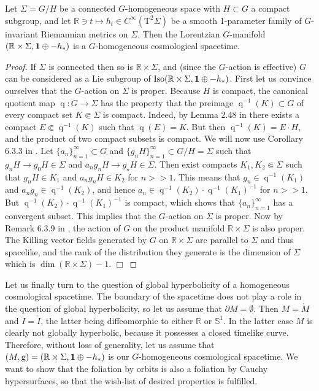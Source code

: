 \documentclass{article}
\begin{document}
\begin{proposition} Let $\Sigma=G/H$ be a connected $G$-homogeneous space with $H\subset G$ a compact subgroup, and let $\mathbb{R}\ni t\mapsto h_t\in C^\infty(\mathrm{T}^2\Sigma)$ be a smooth 1-parameter family of $G$-invariant Riemannian metrics on $\Sigma$. Then the Lorentzian $G$-manifold $(\mathbb{R}\times\Sigma,{\mathbf 1}\oplus-h_*)$ is a $G$-homogeneous cosmological spacetime.
\end{proposition}
\begin{proof}If $\Sigma$ is connected then so is $\mathbb{R}\times\Sigma$, and (since the $G$-action is effective) $G$ can be considered as a Lie subgroup of $\mathrm{Iso}(\mathbb{R}\times\Sigma,{\mathbf 1}\oplus-h_*)$. First let us convince ourselves that the $G$-action on $\Sigma$ is proper. Because $H$ is compact, the canonical quotient map $\operatorname{q}:G\to\Sigma$ has the property that the preimage $\operatorname{q}^{-1}(K)\subset G$ of every compact set $K\Subset\Sigma$ is compact. Indeed, by Lemma 2.48 in \cite{Folland2015} there exists a compact $E\Subset\operatorname{q}^{-1}(K)$ such that $\operatorname{q}(E)=K$. But then $\operatorname{q}^{-1}(K)=E\cdot H$, and the product of two compact subsets is compact. We will now use Corollary 6.3.3 in \cite{RudolphSchmidt2013}. Let $\{a_n\}_{n=1}^\infty\subset G$ and $\{g_nH\}_{n=1}^\infty\subset G/H=\Sigma$ such that $g_nH\to g_0H\in\Sigma$ and $a_ng_nH\to g_\star H\in\Sigma$. Then exist compacts $K_1,K_2\Subset\Sigma$ such that $g_nH\in K_1$ and $a_ng_nH\in K_2$ for $n>>1$. This means that $g_n\in\operatorname{q}^{-1}(K_1)$ and $a_ng_n\in\operatorname{q}^{-1}(K_2)$, and hence $a_n\in\operatorname{q}^{-1}(K_2)\cdot\operatorname{q}^{-1}(K_1)^{-1}$ for $n>>1$. But $\operatorname{q}^{-1}(K_2)\cdot\operatorname{q}^{-1}(K_1)^{-1}$ is compact, which shows that $\{a_n\}_{n=1}^\infty$ has a convergent subset. This implies that the $G$-action on $\Sigma$ is proper. Now by Remark 6.3.9 in \cite{RudolphSchmidt2013}, the action of $G$ on the product manifold $\mathbb{R}\times\Sigma$ is also proper. The Killing vector fields generated by $G$ on $\mathbb{R}\times\Sigma$ are parallel to $\Sigma$ and thus spacelike, and the rank of the distribution they generate is the dimension of $\Sigma$ which is $\dim(\mathbb{R}\times\Sigma)-1$. $\Box$
\end{proof}

Let us finally turn to the question of global hyperbolicity of a homogeneous cosmological spacetime. The boundary of the spacetime does not play a role in the question of global hyperbolicity, so let us assume that $\partial M=\emptyset$. Then $M=\mathring M$ and $I=\mathring I$, the latter being diffeomorphic to either $\mathbb{R}$ or $\mathbb{S}^1$. In the latter case $M$ is clearly not globally hyperbolic, because it possesses a closed timelike curve. Therefore, without loss of generality, let us assume that $(M,\mathrm{g})=(\mathbb{R}\times\Sigma,{\mathbf 1}\oplus-h_*)$ is our $G$-homogeneous cosmological spacetime. We want to show that the foliation by orbits is also a foliation by Cauchy hypersurfaces, so that the wish-list of desired properties is fulfilled.
\end{document}
